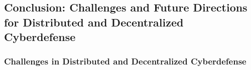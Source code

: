 







\subsection{Conclusion: Challenges and Future Directions for Distributed and Decentralized Cyberdefense}

\subsubsection{Challenges in Distributed and Decentralized Cyberdefense}

